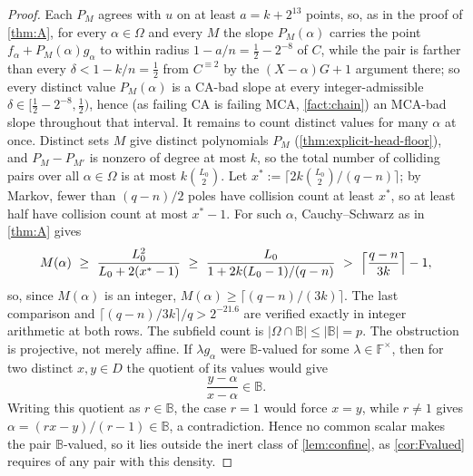 \documentclass[11pt]{article}
\theoremstyle{definition}
\theoremstyle{remark}
\newcommand{\F}{\mathbb{F}}
\newcommand{\B}{\mathbb{B}}
\begin{document}
\begin{proof}
Each $P_M$ agrees with $u$ on at least $a=k+2^{13}$ points, so, as in the proof of \cref{thm:A}, for every $\alpha\in\Omega$ and every $M$ the slope $P_M(\alpha)$ carries the point $f_\alpha+P_M(\alpha)g_\alpha$ to within radius $1-a/n=\frac12-2^{-8}$ of $C$, while the pair is farther than every $\delta<1-k/n=\frac12$ from $C^{\equiv2}$ by the $(X-\alpha)G+1$ argument there; so every distinct value $P_M(\alpha)$ is a CA-bad slope at every integer-admissible $\delta\in[\frac12-2^{-8},\frac12)$, hence \textup(as failing CA is failing MCA, \cref{fact:chain}\textup) an MCA-bad slope throughout that interval. It remains to count distinct values for many $\alpha$ at once. Distinct sets $M$ give distinct polynomials $P_M$ \textup(\cref{thm:explicit-head-floor}\textup), and $P_M-P_{M'}$ is nonzero of degree at most $k$, so the total number of colliding pairs over all $\alpha\in\Omega$ is at most $k\binom{L_0}2$. Let $x^*:=\lceil2k\binom{L_0}2/(q-n)\rceil$; by Markov, fewer than $(q-n)/2$ poles have collision count at least $x^*$, so at least half have collision count at most $x^*-1$. For such $\alpha$, Cauchy--Schwarz as in \cref{thm:A} gives
\[
M(\alpha)\ \ge\ \frac{L_0^2}{L_0+2(x^*-1)}\ \ge\ \frac{L_0}{1+2k(L_0-1)/(q-n)}\ >\ \Bigl\lceil\frac{q-n}{3k}\Bigr\rceil-1,
\]
so, since $M(\alpha)$ is an integer,
$M(\alpha)\ge\lceil(q-n)/(3k)\rceil$. The last comparison and
$\lceil(q-n)/3k\rceil/q>2^{-21.6}$ are verified exactly in integer arithmetic
at both rows. The subfield count is $|\Omega\cap\B|\le|\B|=p$.  The obstruction is
projective, not merely affine.  If $\lambda g_\alpha$ were $\B$-valued for some
$\lambda\in\F^\times$, then for two distinct $x,y\in D$ the quotient of its
values would give
\[
        \frac{y-\alpha}{x-\alpha}\in\B.
\]
Writing this quotient as $r\in\B$, the case $r=1$ would force $x=y$, while
$r\ne1$ gives $\alpha=(rx-y)/(r-1)\in\B$, a contradiction.  Hence no common
scalar makes the pair $\B$-valued, so it lies outside the inert class of
\cref{lem:confine}, as \cref{cor:Fvalued} requires of any pair with this
density.
\end{proof}
\end{document}
